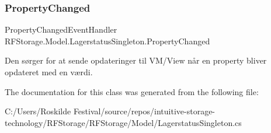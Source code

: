 \subsubsection{\texorpdfstring{PropertyChanged}{PropertyChanged}}
{\footnotesize\ttfamily Property\+Changed\+Event\+Handler R\+F\+Storage.\+Model.\+Lagerstatus\+Singleton.\+Property\+Changed}



Den sørger for at sende opdateringer til V\+M/\+View når en property bliver opdateret med en værdi. 



The documentation for this class was generated from the following file\+:\begin{DoxyCompactItemize}
\item 
C\+:/\+Users/\+Roskilde Festival/source/repos/intuitive-\/storage-\/technology/\+R\+F\+Storage/\+R\+F\+Storage/\+Model/Lagerstatus\+Singleton.\+cs\end{DoxyCompactItemize}
